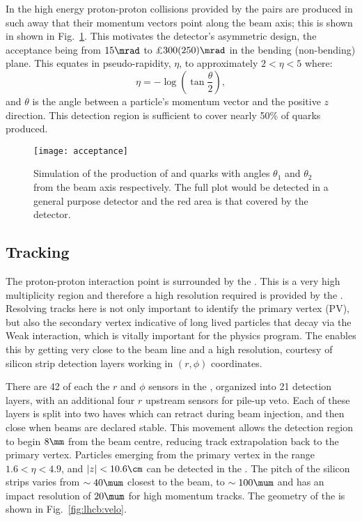 In the high energy proton-proton collisions provided by the \lhc \bbbar pairs are produced in such
away that their momentum vectors point along the beam axis; this is shown in shown in
Fig.~\ref{fig:lhcb:bbbar}.
This motivates the \lhcb detector's asymmetric design, the acceptance being from
$15\mrad$ to £$300(250)\mrad$ in the bending (non-bending) plane.
This equates in pseudo-rapidity, $\eta$, to approximately $2<\eta<5$ where:
\begin{equation}
  \eta = -\log\left(\tan\frac\theta2\right),
\end{equation}
and $\theta$ is the angle between a particle's momentum vector and the positive $z$ direction.
This detection region is sufficient to cover nearly 50\% of \bquark quarks produced.

\begin{figure}
  \begin{center}
    \texttt{[image: acceptance]}
  \end{center}
  \caption[Simulated production of \protect\bbbar pairs]
  {\small
    Simulation of the production of \bquark and \protect\bquarkbar quarks with angles $\theta_1$ and
    $\theta_2$ from the beam axis respectively.
    The full plot would be detected in a general purpose detector and the red area is that covered
    by the \lhcb detector.
  }
  \label{fig:lhcb:bbbar}
\end{figure}



\subsection{Tracking}
The proton-proton interaction point is surrounded by the \velo.
This is a very high multiplicity region and therefore a high resolution required is provided by the
\velo.
Resolving tracks here is not only important to identify the primary vertex (PV), but also the
secondary vertex indicative of long lived particles that decay via the Weak interaction, which is
vitally important for the \lhcb physics program.
The \velo enables this by getting very close to the beam line and a high resolution, courtesy of
silicon strip detection layers working in $(r,\phi)$ coordinates.

There are 42 of each the $r$ and $\phi$ sensors in the \velo, organized into 21 detection layers,
with an additional four $r$ upstream sensors for pile-up veto.
Each of these layers is split into two haves which can retract during \lhc beam injection, and then
close when beams are declared stable.
This movement allows the detection region to begin $8\mm$ from the beam centre, reducing track
extrapolation back to the primary vertex.
Particles emerging from the primary vertex in the range $1.6<\eta<4.9$, and $|z|<10.6\cm$ can be
detected in the \velo.
The pitch of the silicon strips varies from $\sim40\mum$ closest to the beam, to $\sim100\mum$
and has an impact resolution of $20\mum$ for high momentum tracks.
The geometry of the \velo is shown in Fig.~\ref{fig:lhcb:velo}.

